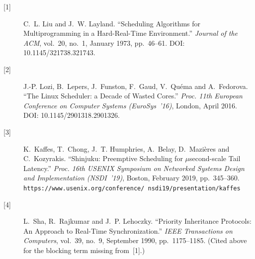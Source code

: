 \begin{description}
\item[{[1]}] C.~L. Liu and J.~W. Layland. ``Scheduling Algorithms for Multiprogramming
  in a Hard-Real-Time Environment.'' \emph{Journal of the ACM}, vol.~20, no.~1,
  January 1973, pp.~46--61. DOI: 10.1145/321738.321743.
\item[{[2]}] J.-P. Lozi, B.~Lepers, J.~Funston, F.~Gaud, V.~Qu\'ema and A.~Fedorova.
  ``The Linux Scheduler: a Decade of Wasted Cores.'' \emph{Proc. 11th European
  Conference on Computer Systems (EuroSys~'16)}, London, April 2016.
  DOI: 10.1145/2901318.2901326.
\item[{[3]}] K.~Kaffes, T.~Chong, J.~T. Humphries, A.~Belay, D.~Mazi\`eres and
  C.~Kozyrakis. ``Shinjuku: Preemptive Scheduling for $\mu$second-scale Tail Latency.''
  \emph{Proc. 16th USENIX Symposium on Networked Systems Design and Implementation
  (NSDI~'19)}, Boston, February 2019, pp.~345--360.
  \texttt{https://www.usenix.org/\allowbreak conference/\allowbreak
  nsdi19/\allowbreak presentation/\allowbreak kaffes}
\item[{[4]}] L.~Sha, R.~Rajkumar and J.~P. Lehoczky. ``Priority Inheritance Protocols:
  An Approach to Real-Time Synchronization.'' \emph{IEEE Transactions on Computers},
  vol.~39, no.~9, September 1990, pp.~1175--1185. (Cited above for the blocking term
  missing from~[1].)
\end{description}
